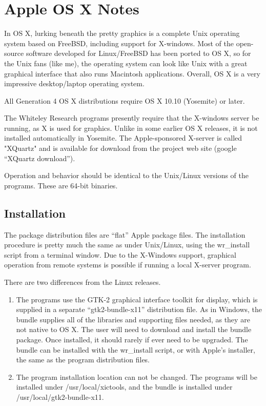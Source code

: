 \section{Apple OS X Notes}

In OS X, lurking beneath the pretty graphics is a complete Unix
operating system based on FreeBSD, including support for X-windows. 
Most of the open-source software developed for Linux/FreeBSD has been
ported to OS X, so for the Unix fans (like me), the operating system
can look like Unix with a great graphical interface that also runs
Macintosh applications.  Overall, OS X is a very impressive
desktop/laptop operating system.

All Generation 4 OS X distributions require OS X 10.10 (Yosemite) or
later.

The Whiteley Research programs presently require that the X-windows
server be running, as X is used for graphics.  Unlike in some earlier
OS X releases, it is not installed automatically in Yosemite.  The
Apple-sponsored X-server is called "XQuartz" and is available for
download from the project web site (google ``XQuartz download'').

Operation and behavior should be identical to the Unix/Linux versions
of the programs.  These are 64-bit binaries.

\subsection{Installation}

The package distribution files are ``flat'' Apple package files.  The
installation procedure is pretty much the same as under Unix/Linux,
using the {\vt wr\_install} script from a terminal window.  Due to the
X-Windows support, graphical operation from remote systems is possible
if running a local X-server program.

There are two differences from the Linux releases.
\begin{enumerate}
\item{The programs use the GTK-2 graphical interface toolkit for
display, which is supplied in a separate ``{\vt gtk2-bundle-x11}''
distribution file.  As in Windows, the bundle supplies all of the
libraries and supporting files needed, as they are not native to OS X. 
The user will need to download and install the bundle package.  Once
installed, it should rarely if ever need to be upgraded.  The bundle
can be installed with the {\vt wr\_install} script, or with Apple's
installer, the same as the program distribution files.}

\item{The program installation location can not be changed.  The
programs will be installed under {\vt /usr/local/xictools}, and the
bundle is installed under {\vt /usr/local/gtk2-bundle-x11}.}
\end{enumerate}

